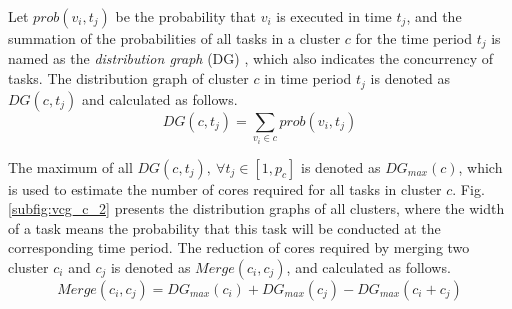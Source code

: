 \documentclass[10pt,journal]{IEEEtran}
\begin{document}
Let $prob(v_i,t_j)$ be the probability that $v_i$ is executed in time $t_j$, and the summation of the probabilities of all tasks in a cluster $c$ for the time period $t_j$ is named as the \textit{distribution graph} (DG) \cite{article:PP}, which also indicates the concurrency of tasks. The distribution graph of cluster $c$ in time period $t_j$ is denoted as $DG(c, t_j)$ and calculated as follows.
\begin{equation}
DG(c, t_j) = \sum \limits_{v_i\in c} prob(v_i, t_j)
\end{equation}


The maximum of all $DG(c, t_j), ~\forall t_j\in[1, p_c]$ is denoted as $DG_{max}(c)$, which is used to estimate the number of cores required for all tasks in cluster $c$. Fig. \ref{subfig:vcg_c_2} presents the distribution graphs of all clusters, where the width of a task means the probability that this task will be conducted at the corresponding time period. The reduction of cores required by merging two cluster $c_i$ and $c_j$ is denoted as $Merge(c_i, c_j)$, and calculated as follows.
\begin{equation}
Merge(c_i, c_j) = DG_{max}(c_i) + DG_{max}(c_j) - DG_{max}(c_i+c_j)
\label{equ:weight_e2}
\end{equation}
\end{document}
